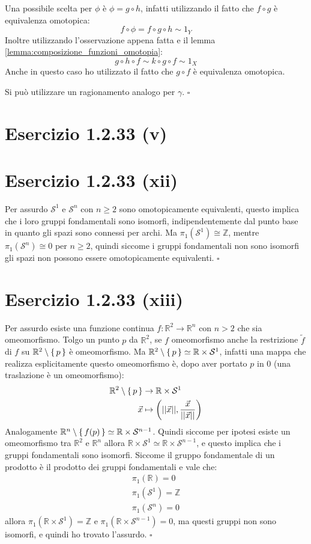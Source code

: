 \documentclass[10pt]{scrartcl}
\newcommand{\Z}{\mathbb{Z}}
\newcommand{\Sph}[1][]{\mathcal{S}^#1}
\begin{document}
Una possibile scelta per $ \phi $ è $ \phi = g \circ h $, infatti utilizzando
il fatto che $ f \circ g $ è equivalenza omotopica:
\[
  f \circ \phi = f \circ g \circ h \sim 1_Y
\]
Inoltre utilizzando l'osservazione appena fatta e il lemma
\ref{lemma:composizione_funzioni_omotopia}:
\[
  g \circ h \circ f \sim k \circ g \circ f \sim 1_X
\]
Anche in questo caso ho utilizzato il fatto che $ g \circ f $ è equivalenza
omotopica.

Si può utilizzare un ragionamento analogo per $ \gamma $.
\hfill $ \square $

\section*{Esercizio 1.2.33 (v)}


\section*{Esercizio 1.2.33 (xii)}
Per assurdo $ \Sph{1} $ e $ \Sph{n} $ con $ n \geq 2 $ sono omotopicamente
equivalenti, questo implica che i loro gruppi fondamentali sono isomorfi,
indipendentemente dal punto base in quanto gli spazi sono connessi per archi.
Ma $ \pi_1(\Sph{1}) \cong \Z $, mentre $ \pi_1(\Sph{n}) \cong 0 $ per $ n \geq 2 $, quindi
siccome i gruppi fondamentali non sono isomorfi gli spazi non possono
essere omotopicamente equivalenti.
\hfill $ \square $

\section*{Esercizio 1.2.33 (xiii)}
Per assurdo esiste una funzione continua $ f \colon \mathbb{R}^2 \to \mathbb{R}^n $
con $ n > 2 $ che sia omeomorfismo. Tolgo un punto $ p $ da $ \mathbb{R}^2 $,
se $ f $ omeomorfismo anche la restrizione $ \tilde{f} $ di $ f $ su
$ \mathbb{R}^2 \setminus \set{p} $ è omeomorfismo.
Ma  $ \mathbb{R}^{2} \setminus  \set{p} \simeq \mathbb{R} \times \mathcal{S}^1 $, infatti una mappa
che realizza esplicitamente questo omeomorfismo è, dopo aver portato $ p $ in $ 0 $
(una traslazione è un omeomorfismo):
\begin{align*}
  \mathbb{R}^{2} \setminus \set{p} & \to \mathbb{R} \times \mathcal{S}^1 \\
  \vec{x} & \mapsto \left( || \vec{x} ||, \frac{\vec{x}}{|| \vec{x} ||} \right)
\end{align*}
Analogamente $ \mathbb{R}^{n} \setminus \set{f(p)}  \simeq \mathbb{R} \times \Sph{n-1} $.
Quindi siccome per ipotesi esiste un omeomorfismo tra $ \mathbb{R}^{2} $ e
$ \mathbb{R}^{n} $ allora $ \mathbb{R} \times \Sph{1} \simeq \mathbb{R} \times \Sph{n-1} $,
e questo implica che i gruppi fondamentali sono isomorfi.
Siccome il gruppo fondamentale di un prodotto è il prodotto dei gruppi fondamentali
e vale che:
\begin{gather*}
  \pi_1(\mathbb{R}) = 0 \\
  \pi_1(\Sph{1}) = \Z \\
  \pi_1(\Sph{n}) = 0
\end{gather*}
allora $ \pi_1 (\mathbb{R} \times \Sph{1}) = \Z $ e $ \pi_1(\mathbb{R} \times \Sph{n-1}) = 0 $, ma
questi gruppi non sono isomorfi, e quindi ho trovato l'assurdo.
\hfill $ \square $
\end{document}
